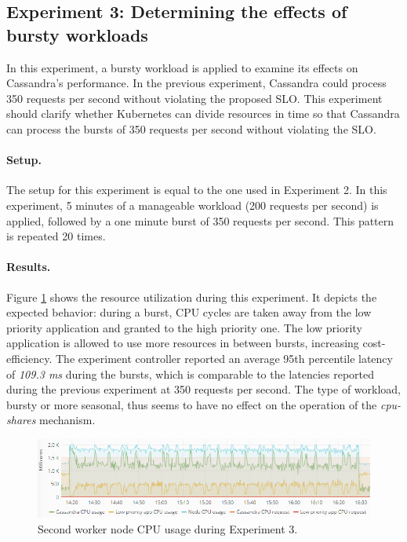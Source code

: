 \subsection{Experiment 3: Determining the effects of bursty workloads}
In this experiment, a bursty workload is applied to examine its effects on Cassandra's performance. In the previous experiment, Cassandra could process 350 requests per second without violating the proposed SLO. This experiment should clarify whether Kubernetes can divide resources in time so that Cassandra can process the bursts of 350 requests per second without violating the SLO.

\paragraph{Setup.}
The setup for this experiment is equal to the one used in Experiment 2. In this experiment, 5 minutes of a manageable workload (200 requests per second) is applied, followed by a one minute burst of 350 requests per second. This pattern is repeated 20 times.  

\paragraph{Results.}
Figure \ref{fig:cpu-cas-lpp-bursty} shows the resource utilization during this experiment. It depicts the expected behavior: during a burst, CPU cycles are taken away from the low priority application and granted to the high priority one. The low priority application is allowed to use more resources in between bursts, increasing cost-efficiency. The experiment controller reported an average 95th percentile latency of \textit{109.3 ms} during the bursts, which is comparable to the latencies reported during the previous experiment at 350 requests per second. The type of workload, bursty or more seasonal, thus seems to have no effect on the operation of the \textit{cpu-shares} mechanism. 

\begin{figure}
\centering
\includegraphics[width=\columnwidth]{Images/Experiments/CPU/Grafana/cpu-cas-lpp-bursty.PNG}
\caption{Second worker node CPU usage during Experiment 3.}
\vspace{-5mm}
\label{fig:cpu-cas-lpp-bursty}
\end{figure}

